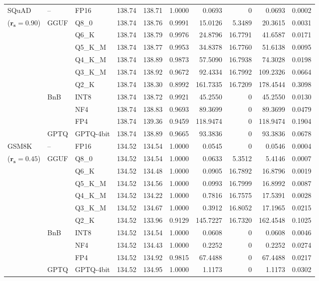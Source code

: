 \begin{longtable}{ll l rrrrrrr}
\midrule
SQuAD & -- & FP16 & 138.74 & 138.71 & 1.0000 & 0.0693 & \cellcolor{cyan!12} $0$ & 0.0693 & 0.0002 \\
{\small ($\mathbf{r_s{=}0.90}$)} & GGUF & Q8\_0 & 138.74 & 138.76 & 0.9991 & 15.0126 & 5.3489 & 20.3615 & 0.0031 \\
 &  & Q6\_K & 138.74 & 138.79 & 0.9976 & 24.8796 & 16.7791 & 41.6587 & 0.0171 \\
 &  & Q5\_K\_M & 138.74 & 138.77 & 0.9953 & 34.8378 & 16.7760 & 51.6138 & 0.0095 \\
 &  & Q4\_K\_M & 138.74 & 138.89 & 0.9873 & 57.5090 & 16.7938 & 74.3028 & 0.0198 \\
 &  & Q3\_K\_M & 138.74 & 138.92 & 0.9672 & 92.4334 & 16.7992 & 109.2326 & 0.0664 \\
 &  & Q2\_K & 138.74 & 138.30 & \cellcolor{red!18} 0.8992 & \cellcolor{red!18} 161.7335 & 16.7209 & \cellcolor{red!18} 178.4544 & \cellcolor{red!18} 0.3098 \\
 & BnB & INT8 & 138.74 & 138.72 & 0.9921 & 45.2550 & \cellcolor{cyan!12} $0$ & 45.2550 & 0.0130 \\
 &  & NF4 & 138.74 & 138.83 & 0.9693 & 89.3699 & \cellcolor{cyan!12} $0$ & 89.3699 & 0.0479 \\
 &  & FP4 & 138.74 & 139.36 & \cellcolor{red!18} 0.9459 & \cellcolor{red!18} 118.9474 & \cellcolor{cyan!12} $0$ & \cellcolor{red!18} 118.9474 & \cellcolor{red!18} 0.1904 \\
 & GPTQ & GPTQ-4bit & 138.74 & 138.89 & 0.9665 & 93.3836 & \cellcolor{cyan!12} $0$ & 93.3836 & 0.0678 \\
\midrule
GSM8K & -- & FP16 & 134.52 & 134.54 & 1.0000 & 0.0545 & \cellcolor{cyan!12} $0$ & 0.0546 & 0.0004 \\
{\small ($\mathbf{r_s{=}0.45}$)} & GGUF & Q8\_0 & 134.52 & 134.54 & 1.0000 & 0.0633 & 5.3512 & 5.4146 & 0.0007 \\
 &  & Q6\_K & 134.52 & 134.48 & 1.0000 & 0.0905 & 16.7892 & 16.8796 & 0.0019 \\
 &  & Q5\_K\_M & 134.52 & 134.56 & 1.0000 & 0.0993 & 16.7999 & 16.8992 & 0.0087 \\
 &  & Q4\_K\_M & 134.52 & 134.22 & 1.0000 & 0.7816 & 16.7575 & 17.5391 & 0.0028 \\
 &  & Q3\_K\_M & 134.52 & 134.67 & 1.0000 & 0.3912 & 16.8052 & 17.1965 & 0.0215 \\
 &  & Q2\_K & 134.52 & 133.96 & \cellcolor{red!18} 0.9129 & \cellcolor{red!18} 145.7227 & 16.7320 & \cellcolor{red!18} 162.4548 & \cellcolor{red!18} 0.1025 \\
 & BnB & INT8 & 134.52 & 134.54 & 1.0000 & 0.0608 & \cellcolor{cyan!12} $0$ & 0.0608 & 0.0046 \\
 &  & NF4 & 134.52 & 134.43 & 1.0000 & 0.2252 & \cellcolor{cyan!12} $0$ & 0.2252 & 0.0274 \\
 &  & FP4 & 134.52 & 134.92 & 0.9815 & 67.4488 & \cellcolor{cyan!12} $0$ & 67.4488 & 0.0217 \\
 & GPTQ & GPTQ-4bit & 134.52 & 134.95 & 1.0000 & 1.1173 & \cellcolor{cyan!12} $0$ & 1.1173 & 0.0302 \\
\end{longtable}
\endgroup